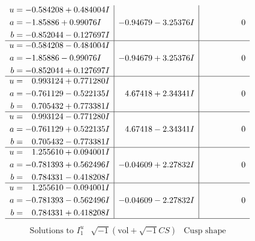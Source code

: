 \documentclass[1p]{elsarticle_modified}
\theoremstyle{definition}
\newcommand{\I}{\sqrt{-1}}
\begin{document}
$$\begin{array}{c|c|c}
\begin{aligned}
u &= -0.584208 + 0.484004 I \\
a &= -1.85886 + 0.99076 I \\
b &= -0.852044 - 0.127697 I\end{aligned}
 & -0.94679 - 3.25376 I & \phantom{-0.000000 } 0 \\ \hline\begin{aligned}
u &= -0.584208 - 0.484004 I \\
a &= -1.85886 - 0.99076 I \\
b &= -0.852044 + 0.127697 I\end{aligned}
 & -0.94679 + 3.25376 I & \phantom{-0.000000 } 0 \\ \hline\begin{aligned}
u &= \phantom{-}0.993124 + 0.771280 I \\
a &= -0.761129 - 0.522135 I \\
b &= \phantom{-}0.705432 + 0.773381 I\end{aligned}
 & \phantom{-}4.67418 + 2.34341 I & \phantom{-0.000000 } 0 \\ \hline\begin{aligned}
u &= \phantom{-}0.993124 - 0.771280 I \\
a &= -0.761129 + 0.522135 I \\
b &= \phantom{-}0.705432 - 0.773381 I\end{aligned}
 & \phantom{-}4.67418 - 2.34341 I & \phantom{-0.000000 } 0 \\ \hline\begin{aligned}
u &= \phantom{-}1.255610 + 0.094001 I \\
a &= -0.781393 + 0.562496 I \\
b &= \phantom{-}0.784331 - 0.418208 I\end{aligned}
 & -0.04609 + 2.27832 I & \phantom{-0.000000 } 0 \\ \hline\begin{aligned}
u &= \phantom{-}1.255610 - 0.094001 I \\
a &= -0.781393 - 0.562496 I \\
b &= \phantom{-}0.784331 + 0.418208 I\end{aligned}
 & -0.04609 - 2.27832 I & \phantom{-0.000000 } 0\\
 \hline 
 \end{array}$$\newpage$$\begin{array}{c|c|c}  
\text{Solutions to }I^u_{1}& \I (\text{vol} + \sqrt{-1}CS) & \text{Cusp shape}\\
 \hline 
\begin{aligned}

\end{aligned}
\end{array}$$
\end{document}
